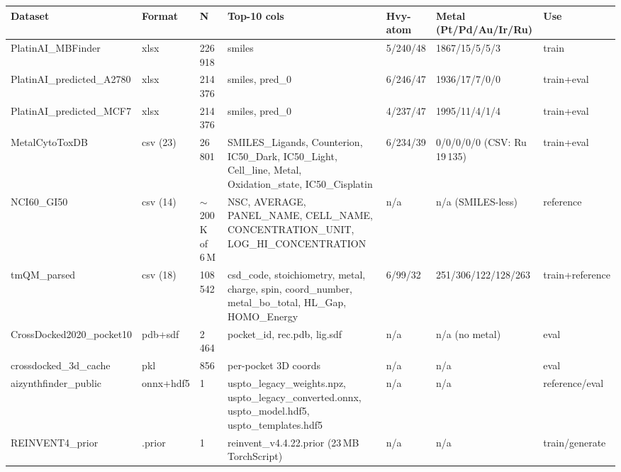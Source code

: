 \begin{table}[h]
\centering
\small
\begin{tabular}{p{3.5cm}p{1.7cm}p{1.2cm}p{2.6cm}p{1.5cm}p{2.4cm}p{1.6cm}}
\hline
\textbf{Dataset} & \textbf{Format} & \textbf{N} & \textbf{Top-10 cols} & \textbf{Hvy-atom} & \textbf{Metal (Pt/Pd/Au/Ir/Ru)} & \textbf{Use} \\
\hline
PlatinAI\_MBFinder            & xlsx       & 226\,918 & smiles                                                    & 5/240/48  & 1867/15/5/5/3      & train \\
PlatinAI\_predicted\_A2780    & xlsx       & 214\,376 & smiles, pred\_0                                            & 6/246/47  & 1936/17/7/0/0      & train+eval \\
PlatinAI\_predicted\_MCF7     & xlsx       & 214\,376 & smiles, pred\_0                                            & 4/237/47  & 1995/11/4/1/4      & train+eval \\
MetalCytoToxDB                & csv (23)   &  26\,801 & SMILES\_Ligands, Counterion, IC50\_Dark, IC50\_Light, Cell\_line, Metal, Oxidation\_state, IC50\_Cisplatin & 6/234/39 & 0/0/0/0/0 (CSV: Ru\,19\,135) & train+eval \\
NCI60\_GI50                   & csv (14)   & $\sim$200\,K of 6\,M & NSC, AVERAGE, PANEL\_NAME, CELL\_NAME, CONCENTRATION\_UNIT, LOG\_HI\_CONCENTRATION & n/a & n/a (SMILES-less) & reference \\
tmQM\_parsed                  & csv (18)   & 108\,542 & csd\_code, stoichiometry, metal, charge, spin, coord\_number, metal\_bo\_total, HL\_Gap, HOMO\_Energy & 6/99/32 & 251/306/122/128/263 & train+reference \\
CrossDocked2020\_pocket10     & pdb+sdf    &   2\,464 & pocket\_id, rec.pdb, lig.sdf                                & n/a       & n/a (no metal)     & eval \\
crossdocked\_3d\_cache        & pkl        &     856 & per-pocket 3D coords                                       & n/a       & n/a                & eval \\
aizynthfinder\_public         & onnx+hdf5  &       1 & uspto\_legacy\_weights.npz, uspto\_legacy\_converted.onnx, uspto\_model.hdf5, uspto\_templates.hdf5 & n/a & n/a & reference/eval \\
REINVENT4\_prior              & .prior     &       1 & reinvent\_v4.4.22.prior (23\,MB TorchScript)               & n/a       & n/a                & train/generate \\
\hline
\end{tabular}

\end{table}
